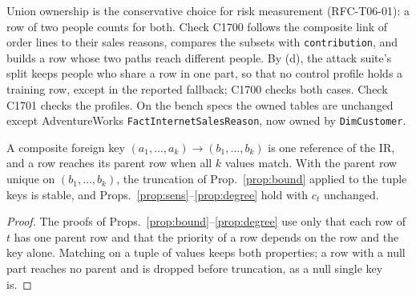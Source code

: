 \noindent Union ownership is the conservative choice for risk measurement (RFC-T06-01): a row of two people counts for both. Check C1700 follows the composite link of order lines to their sales reasons, compares the subsets with \texttt{contribution}, and builds a row whose two paths reach different people. By (d), the attack suite's split keeps people who share a row in one part, so that no control profile holds a training row, except in the reported fallback; C1700 checks both cases. Check C1701 checks the profiles. On the bench specs the owned tables are unchanged except AdventureWorks \texttt{FactInternetSalesReason}, now owned by \texttt{DimCustomer}.

\setcounter{proposition}{1700}
\begin{proposition}\label{prop:compkey}
A composite foreign key $(a_1,\dots,a_k)\to(b_1,\dots,b_k)$ is one reference of the IR, and a row reaches its parent row when all $k$ values match. With the parent row unique on $(b_1,\dots,b_k)$, the truncation of Prop.~\ref{prop:bound} applied to the tuple keys is stable, and Props.~\ref{prop:sens}--\ref{prop:degree} hold with $c_t$ unchanged.
\end{proposition}
\begin{proof}
The proofs of Props.~\ref{prop:bound}--\ref{prop:degree} use only that each row of $t$ has one parent row and that the priority of a row depends on the row and the key alone. Matching on a tuple of values keeps both properties; a row with a null part reaches no parent and is dropped before truncation, as a null single key is.
\end{proof}


